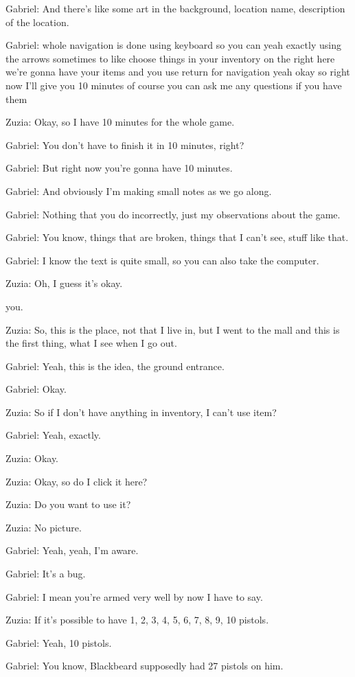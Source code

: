 Gabriel: And there's like some art in the background, location name, description of the location.

Gabriel: whole navigation is done using keyboard so you can yeah exactly using the arrows sometimes to like choose things in your inventory on the right here we're gonna have your items and you use return for navigation yeah okay so right now I'll give you 10 minutes of course you can ask me any questions if you have them

Zuzia: Okay, so I have 10 minutes for the whole game.

Gabriel: You don't have to finish it in 10 minutes, right?

Gabriel: But right now you're gonna have 10 minutes.

Gabriel: And obviously I'm making small notes as we go along.

Gabriel: Nothing that you do incorrectly, just my observations about the game.

Gabriel: You know, things that are broken, things that I can't see, stuff like that.

Gabriel: I know the text is quite small, so you can also take the computer.

Zuzia: Oh, I guess it's okay.

you.

Zuzia: So, this is the place, not that I live in, but I went to the mall and this is the first thing, what I see when I go out.

Gabriel: Yeah, this is the idea, the ground entrance.

Gabriel: Okay.

Zuzia: So if I don't have anything in inventory, I can't use item?

Gabriel: Yeah, exactly.

Zuzia: Okay.

Zuzia: Okay, so do I click it here?

Zuzia: Do you want to use it?

Zuzia: No picture.

Gabriel: Yeah, yeah, I'm aware.

Gabriel: It's a bug.

Gabriel: I mean you're armed very well by now I have to say.

Zuzia: If it's possible to have 1, 2, 3, 4, 5, 6, 7, 8, 9, 10 pistols.

Gabriel: Yeah, 10 pistols.

Gabriel: You know, Blackbeard supposedly had 27 pistols on him.

